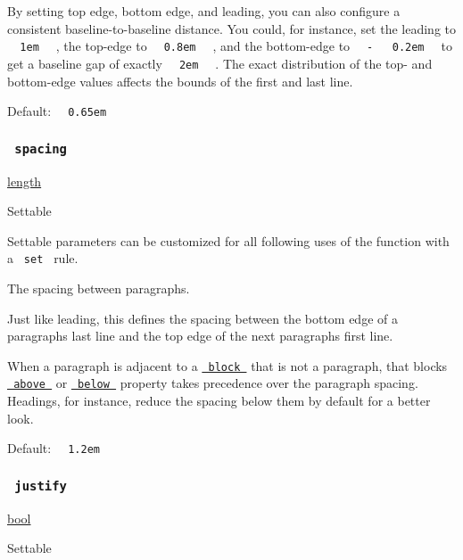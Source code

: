 By setting top edge, bottom edge, and leading, you can also configure a
consistent baseline-to-baseline distance. You could, for instance, set
the leading to \texttt{\ }{\texttt{\ 1em\ }}\texttt{\ } , the top-edge
to \texttt{\ }{\texttt{\ 0.8em\ }}\texttt{\ } , and the bottom-edge to
\texttt{\ }{\texttt{\ -\ }}\texttt{\ }{\texttt{\ 0.2em\ }}\texttt{\ } to
get a baseline gap of exactly \texttt{\ }{\texttt{\ 2em\ }}\texttt{\ } .
The exact distribution of the top- and bottom-edge values affects the
bounds of the first and last line.

Default: \texttt{\ }{\texttt{\ 0.65em\ }}\texttt{\ }

\subsubsection{\texorpdfstring{\texttt{\ spacing\ }}{ spacing }}\label{parameters-spacing}

\href{/docs/reference/layout/length/}{length}

{{ Settable }}

\label{parameters-spacing-settable-tooltip}
Settable parameters can be customized for all following uses of the
function with a \texttt{\ set\ } rule.

The spacing between paragraphs.

Just like leading, this defines the spacing between the bottom edge of a
paragraph\textquotesingle s last line and the top edge of the next
paragraph\textquotesingle s first line.

When a paragraph is adjacent to a
\href{/docs/reference/layout/block/}{\texttt{\ block\ }} that is not a
paragraph, that block\textquotesingle s
\href{/docs/reference/layout/block/\#parameters-above}{\texttt{\ above\ }}
or
\href{/docs/reference/layout/block/\#parameters-below}{\texttt{\ below\ }}
property takes precedence over the paragraph spacing. Headings, for
instance, reduce the spacing below them by default for a better look.

Default: \texttt{\ }{\texttt{\ 1.2em\ }}\texttt{\ }

\subsubsection{\texorpdfstring{\texttt{\ justify\ }}{ justify }}\label{parameters-justify}

\href{/docs/reference/foundations/bool/}{bool}

{{ Settable }}

